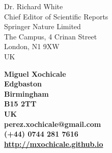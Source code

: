 \documentclass[10pt]{letter}
\begin{document}
\begin{letter}{Dr. Richard White \\
Chief Editor of Scientific Reports \\
Springer Nature Limited \\
The Campus, 4 Crinan Street\\
London, N1 9XW \\
UK
} 

\begin{flushright}
\large\bf Miguel Xochicale \\ %
Edgbaston\\
Birmingham\\
B15 2TT\\
UK\\
\faEnvelopeO  perez.xochicale@gmail.com \\
\faMobile  (+44) 0744 281 7616 \\
\faHome \href{http://mxochicale.github.io}{http://mxochicale.github.io}
\end{flushright} 

\vspace{20pt}
\signature{Miguel Xochicale} %



\end{letter}
\end{document}
